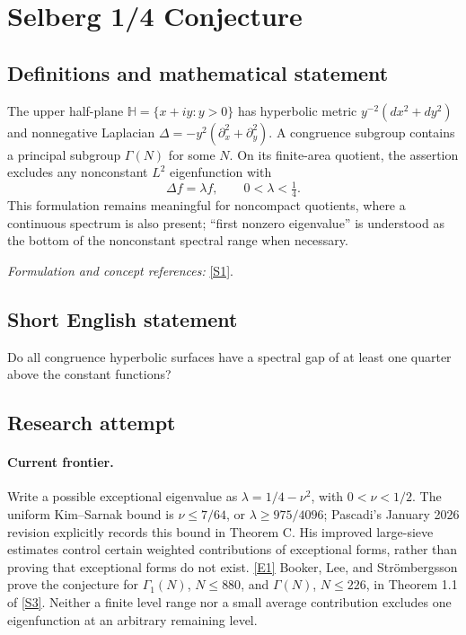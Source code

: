 \documentclass[11pt]{article}
\newcommand{\sref}[2]{\hyperlink{source:#1:#2}{[S#2]}}
\newcommand{\eref}[2]{\hyperlink{extra:#1:#2}{[E#2]}}
\newif\ifshowcatalogue
\newcommand{\cataloguescope}[1]{\ifshowcatalogue
 \paragraph{Exact scope in the supplied catalogue.}
 \begin{quote}\small #1\end{quote}\fi}
\begin{document}
\setcounter{section}{100}
\clearpage
\section{\texorpdfstring{Selberg 1/4 Conjecture}{Selberg 1/4 Conjecture}}\label{101}
\subsection{Definitions and mathematical statement}
The upper half-plane $\mathbb H=\{x+iy:y>0\}$ has hyperbolic metric $y^{-2}(dx^2+dy^2)$ and nonnegative Laplacian $\Delta=-y^2(\partial_x^2+\partial_y^2)$. A congruence subgroup contains a principal subgroup $\Gamma(N)$ for some $N$. On its finite-area quotient, the assertion excludes any nonconstant $L^2$ eigenfunction with
\[
 \Delta f=\lambda f,\qquad0<\lambda<\tfrac14.
\]
This formulation remains meaningful for noncompact quotients, where a continuous spectrum is also present; ``first nonzero eigenvalue'' is understood as the bottom of the nonconstant spectral range when necessary.
\par\smallskip\textit{Formulation and concept references:} \sref{101}{1}.
\cataloguescope{Prove that the first nonzero eigenvalue lambda\_1 of the Laplace-Beltrami operator on every congruence quotient of the upper half-plane is at least 1/4.}
\subsection{Short English statement}
Do all congruence hyperbolic surfaces have a spectral gap of at least one quarter above the constant functions?
\subsection{Research attempt}

\paragraph{Current frontier.}
Write a possible exceptional eigenvalue as $\lambda=1/4-\nu^2$, with
$0<\nu<1/2$. The uniform Kim--Sarnak bound is
$\nu\le 7/64$, or $\lambda\ge 975/4096$; Pascadi's January 2026 revision
explicitly records this bound in Theorem C. His improved large-sieve estimates
control certain weighted contributions of exceptional forms, rather than proving
that exceptional forms do not exist. \eref{101}{1}
Booker, Lee, and Str\"ombergsson prove the conjecture for $\Gamma_1(N)$,
$N\le880$, and $\Gamma(N)$, $N\le226$, in Theorem 1.1 of
\sref{101}{3}. Neither a finite level range nor a small average contribution
excludes one eigenfunction at an arbitrary remaining level.
\end{document}
